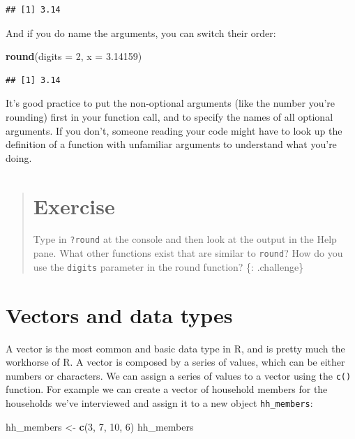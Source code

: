 \documentclass[]{book}
\newenvironment{Shaded}{\begin{snugshade}}{\end{snugshade}}
\newcommand{\KeywordTok}[1]{\textcolor[rgb]{0.13,0.29,0.53}{\textbf{#1}}}
\newcommand{\DataTypeTok}[1]{\textcolor[rgb]{0.13,0.29,0.53}{#1}}
\newcommand{\DecValTok}[1]{\textcolor[rgb]{0.00,0.00,0.81}{#1}}
\newcommand{\FloatTok}[1]{\textcolor[rgb]{0.00,0.00,0.81}{#1}}
\newcommand{\StringTok}[1]{\textcolor[rgb]{0.31,0.60,0.02}{#1}}
\newcommand{\NormalTok}[1]{#1}
\begin{document}
\begin{verbatim}
## [1] 3.14
\end{verbatim}

And if you do name the arguments, you can switch their order:

\begin{Shaded}
\begin{Highlighting}[]
\KeywordTok{round}\NormalTok{(}\DataTypeTok{digits =} \DecValTok{2}\NormalTok{, }\DataTypeTok{x =} \FloatTok{3.14159}\NormalTok{)}
\end{Highlighting}
\end{Shaded}

\begin{verbatim}
## [1] 3.14
\end{verbatim}

It's good practice to put the non-optional arguments (like the number
you're rounding) first in your function call, and to specify the names
of all optional arguments. If you don't, someone reading your code might
have to look up the definition of a function with unfamiliar arguments
to understand what you're doing.

\begin{quote}
\section{Exercise}\label{exercise-3}

Type in \texttt{?round} at the console and then look at the output in
the Help pane. What other functions exist that are similar to
\texttt{round}? How do you use the \texttt{digits} parameter in the
round function? \{: .challenge\}
\end{quote}

\section{Vectors and data types}\label{vectors-and-data-types}

A vector is the most common and basic data type in R, and is pretty much
the workhorse of R. A vector is composed by a series of values, which
can be either numbers or characters. We can assign a series of values to
a vector using the \texttt{c()} function. For example we can create a
vector of household members for the households we've interviewed and
assign it to a new object \texttt{hh\_members}:

\begin{Shaded}
\begin{Highlighting}[]
\NormalTok{hh_members <-}\StringTok{ }\KeywordTok{c}\NormalTok{(}\DecValTok{3}\NormalTok{, }\DecValTok{7}\NormalTok{, }\DecValTok{10}\NormalTok{, }\DecValTok{6}\NormalTok{)}
\NormalTok{hh_members}
\end{Highlighting}
\end{Shaded}
\end{document}
